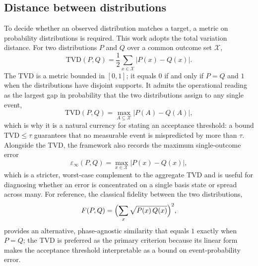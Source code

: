 \documentclass[11pt,a4paper]{article}
\newcommand{\tvd}{\mathrm{TVD}}
\begin{document}
\subsection{Distance between distributions}
To decide whether an observed distribution matches a target, a metric on probability distributions is required. This work adopts the total variation distance. For two distributions $P$ and $Q$ over a common outcome set $\mathcal{X}$,
\begin{equation}
\tvd(P,Q)=\frac{1}{2}\sum_{x\in\mathcal{X}}\bigl|P(x)-Q(x)\bigr|.
\label{eq:tvd}
\end{equation}
The TVD is a metric bounded in $[0,1]$; it equals $0$ if and only if $P=Q$ and $1$ when the distributions have disjoint supports. It admits the operational reading as the largest gap in probability that the two distributions assign to any single event,
\begin{equation}
\tvd(P,Q)=\max_{A\subseteq\mathcal{X}}\bigl|P(A)-Q(A)\bigr|,
\label{eq:tvdmax}
\end{equation}
which is why it is a natural currency for stating an acceptance threshold: a bound $\tvd\le\tau$ guarantees that no measurable event is mispredicted by more than $\tau$. Alongside the TVD, the framework also records the maximum single-outcome error
\begin{equation}
\varepsilon_{\infty}(P,Q)=\max_{x\in\mathcal{X}}\bigl|P(x)-Q(x)\bigr|,
\label{eq:maxerr}
\end{equation}
which is a stricter, worst-case complement to the aggregate TVD and is useful for diagnosing whether an error is concentrated on a single basis state or spread across many. For reference, the classical fidelity between the two distributions,
\begin{equation}
F(P,Q)=\Bigl(\sum_{x}\sqrt{P(x)\,Q(x)}\Bigr)^{2},
\label{eq:fidelity}
\end{equation}
provides an alternative, phase-agnostic similarity that equals $1$ exactly when $P=Q$; the TVD is preferred as the primary criterion because its linear form makes the acceptance threshold interpretable as a bound on event-probability error.
\end{document}
